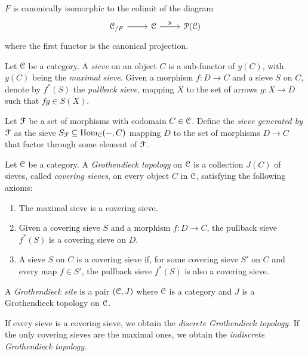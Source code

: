 \documentclass[10pt]{amsart}
\begin{document}
	\begin{theorem}\label{thm:density}
		$F$ is canonically isomorphic to the colimit of the diagram \begin{equation}
			\begin{tikzcd}
				\lC_{/F} \arrow[r] & \lC \arrow[r,"y"] & \lP(\lC)
			\end{tikzcd}
		\end{equation}where the first functor is the canonical projection.
	\end{theorem}
	\begin{definition}
		Let $\mathcal{C}$ be a category. A \emph{sieve} on an object $C$ is a sub-functor of $y(C)$, with $y(C)$ being the \textit{maximal sieve}. Given a morphism $f\colon D\to C$ and a sieve $S$ on $C$, denote by $f^*(S)$ the \textit{pullback sieve}, mapping $X$ to the set of arrows $g\colon X\to D$ such that $fg\in S(X)$. 
	\end{definition}
	\begin{definition}\label{def:generatedsieve}
		Let ${\mathcal{F}}$ be a set of morphisms with codomain $C\in\mathcal{C}$. Define the \emph{sieve generated by $\mathcal{F}$} as the sieve $S_{\mathcal{F}}\subseteq\mathrm{Hom}_{\mathcal{C}}(-,C)$ mapping $D$ to the set of morphisms $D\to C$ that factor through some element of $\mathcal{F}$. 
	\end{definition}
	\begin{definition}
		Let $\mathcal{C}$ be a category. A \emph{Grothendieck topology} on $\mathcal{C}$ is a collection $J(C)$ of sieves, called \textit{covering sieves}, on every object $C$ in $\mathcal{C}$, satisfying the following axioms:
		\begin{enumerate}
			\item The maximal sieve is a covering sieve.
			\item Given a covering sieve $S$ and a morphism $f\colon D \to C$, the pullback sieve $f^*(S)$ is a covering sieve on $D$.
			\item A sieve $S$ on $C$ is a covering sieve if, for some covering sieve $S'$ on $C$ and every map $f\in S'$, the pullback sieve $f^*(S)$ is also a covering sieve. 
		\end{enumerate}
		A \emph{Grothendieck site} is a pair $(\mathcal{C}, J)$ where $\mathcal{C}$ is a category and $J$ is a Grothendieck topology on $\mathcal{C}$.
	\end{definition}
	\begin{example}If every sieve is a covering sieve, we obtain the \emph{discrete Grothendieck topology}. If the only covering sieves are the maximal ones, we obtain the \textit{indiscrete Grothendieck topology}.
	\end{example}
\end{document}
